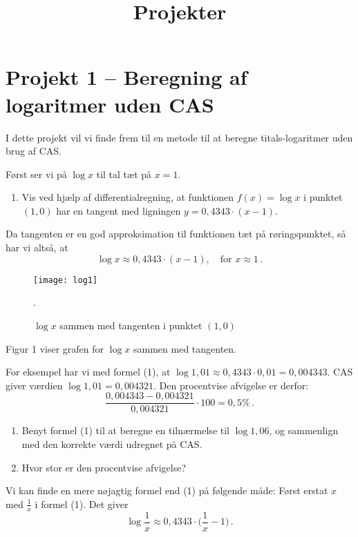 \documentclass[12pt,oneside,a4paper]{article}
\title{Projekter}
\date{\vspace{-5ex}}
\theoremstyle{plain}
\begin{document}
\maketitle

\section*{Projekt 1 -- Beregning af logaritmer uden CAS}
I dette projekt vil vi finde frem til en metode til at beregne
titals-logaritmer uden brug af CAS.

Først ser vi på $\log x$ til tal tæt på $x=1$.

\begin{enumerate}[label=(\alph*)]
    \item Vis ved hjælp af differentialregning, at funktionen $f(x) = \log x$ i
        punktet $(1, 0)$ har en tangent med ligningen $y = 0,4343 \cdot (x-1)$.
\end{enumerate}
Da tangenten er en god approksimation til funktionen tæt på røringspunktet,
så har vi altså, at 
\[
    \tag{1}
    \log x \approx 0,4343\cdot(x-1),\quad \mbox{for $x\approx 1$}\,.
\]
\begin{figure}[ht]
    \centering
    \texttt{[image: log1]}
    \caption{$\log x$ sammen med tangenten i punktet $(1, 0)$}.
    \label{log1}
\end{figure}
Figur 1 viser grafen for $\log x$ sammen med tangenten.

For eksempel har vi med formel (1), at $\log 1,01 \approx 0,4343\cdot 0,01 = 0,004343$.
CAS giver værdien $\log 1,01 = 0,004321$. Den procentvise afvigelse er derfor:
\[
    \frac{0,004343-0,004321}{0,004321}\cdot 100 = 0,5 \% \,.
\]

\begin{enumerate}[label=(\alph*), resume]
    \item Benyt formel (1) til at beregne en tilnærmelse til $\log
        1,06$, og sammenlign med den korrekte værdi udregnet på CAS.
    \item Hvor stor er den procentvise afvigelse?
\end{enumerate}

Vi kan finde en mere nøjagtig formel end (1) på følgende måde: Først erstat $x$ med
$\frac1x$ i formel (1). Det giver
\[
    \tag{2}
    \log\frac1x \approx 0,4343\cdot\Big(\frac1x-1\Big)\,.
\]
\end{document}
